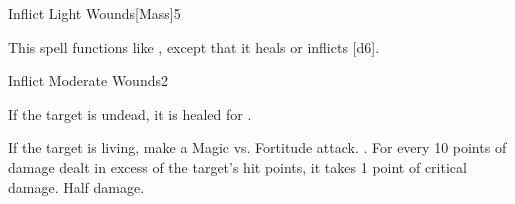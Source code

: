 \begin{spellsection}{Inflict Light Wounds}[Mass]{5}
    \begin{spellheader}
    \end{spellheader}
    \begin{spellcontent}
        \begin{spelltargetinginfo}
        \end{spelltargetinginfo}
        \begin{spelleffects}
            \spellspecial This spell functions like , except that it heals or inflicts [d6].
        \end{spelleffects}
    \end{spellcontent}
    \begin{spellfooter}
        \miscastexplode
    \end{spellfooter}
\end{spellsection}

\begin{spellsection}{Inflict Moderate Wounds}{2}
    \begin{spellheader}
    \end{spellheader}
    \begin{spellcontent}
        \begin{spelltargetinginfo}
        \end{spelltargetinginfo}
        \begin{spelleffects}
            \spelleffect If the target is undead, it is healed for .
            \begin{spellattacktriggered}{If the target is living, make a Magic vs. Fortitude attack.}
                \spellsuccess {}. For every 10 points of damage dealt in excess of the target's hit points, it takes 1 point of critical damage.
                \spellfailure Half damage.
            \end{spellattacktriggered}
        \end{spelleffects}
    \end{spellcontent}
    \begin{spellfooter}
        \miscastrandom
    \end{spellfooter}
\end{spellsection}

